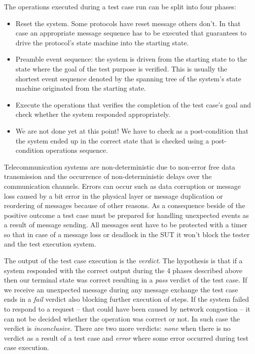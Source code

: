 \documentclass[a4paper]{article}
\begin{document}
The operations executed during a test case run can be split into four phases:
\begin{itemize}
    \item Reset the system. Some protocols have reset message others don't. In that case an appropriate message
          sequence
          has to be executed that guarantees to drive the protocol's state machine into the starting state.
    \item Preamble event sequence: the system is driven from the starting state to the state where the goal of the test
          purpose is verified. This is usually the shortest event sequence denoted by the spanning tree of the system's
          state
          machine originated from the starting state.
    \item Execute the operations that verifies the completion of the test case's goal and check whether the system
          responded appropriately.
    \item We are not done yet at this point! We have to check as a post-condition that the system ended up in the
          correct
          state that is checked using a post-condition operations sequence.
\end{itemize}

Telecommunication systems are non-deterministic due to non-error free data transmission and the occurrence of
non-deterministic delays over the communication channels. Errors can occur such as data corruption or message loss
caused by a bit error in the physical layer or message duplication or reordering of messages because of other reasons.
As a consequence beside of the positive outcome a test case must be prepared for handling unexpected events as a result
of message sending. All messages sent have to be protected with a timer so that in case of a message loss or deadlock
in the SUT it won't block the tester and the test execution system.

The output of the test case execution is the \emph{verdict}. The hypothesis is that if a system responded with the
correct output during the 4 phases described above then our terminal state was correct resulting in a \emph{pass}
verdict of the test case. If we receive an unexpected message during any message exchange the test case ends in a
\emph{fail} verdict also blocking further execution of steps. If the system failed to respond to a request -- that
could have been caused by network congestion -- it can not be decided whether the operation was correct or not. In such case
the verdict is \emph{inconclusive}. There are two more verdicts: \emph{none} when there is no verdict as a result of a
test case and \emph{error} where some error occurred during test case execution.
\end{document}
